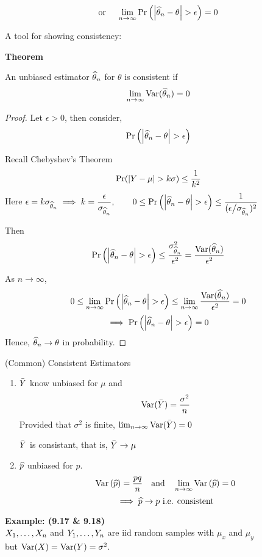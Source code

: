 $$\text{or } \quad \limn \P{\abs{\that_n - \theta} > \epsilon} = 0$$

\disc A tool for showing consistency:

\nl \textbf{Theorem}  An unbiased estimator $\widehat{\theta}_n$ for $\theta$ is consistent if
$$\limn \Var*{\that_n} = 0$$

\begin{proof}
Let $\epsilon > 0$, then consider, 
$$\prob{\left| \that_n - \theta \right| > \epsilon}$$

\nl Recall Chebyshev's Theorem
$$\Pr (\abs{Y-\mu} > k\sigma) \leq \over{k^2}$$
Here $\epsilon = k\sigma_{\that_n} \implies k = \dfrac{\epsilon}{\sigma_{\that_n}}, \qquad \displaystyle 0 \leq \P{\left| \that_n - \theta \right| > \epsilon} \leq \frac{1}{(\epsilon \big/\sigma_{\that_n})^2}$

\nl Then
$$\P{\left|\that_n- \theta \right| > \epsilon} \leq \frac{\sigma_{\that_n}^2}{\epsilon^2} = \frac{\Var*{\that_n}}{\epsilon^2}$$

\nl As $n \to \infty$,
$$0 \leq \limn \P{\left| \that_n - \theta \right| > \epsilon} \leq \limn \frac{\Var*{\that_n}}{\epsilon^2} = 0$$
$$\implies \P{\left| \that_n - \theta \right| > \epsilon} = 0$$
Hence, $\widehat{\theta}_n \to \theta$ in probability.
\end{proof}

\example (Common) Consistent Estimators

\begin{enumerate}[label=\textcircled{\raisebox{-1pt}{\arabic*}}]
	\item
		$\bar{Y}$ know unbiased for $\mu$ and
		$$\Var*{\Ybar} = \frac{\sigma^2}{n}$$
		Provided that $\sigma^2$ is finite, $\limn \Var*{\Ybar} = 0$

		\nl $\bar{Y}$ is consistant, that is, $\bar{Y} \to \mu$

	\item
		$\widehat{p}$ unbiased for $p$.
		$$\Var{\phat} = \frac{pq}{n} \quad \text{and}\quad \limn \Var{\phat} = 0$$
		$$\implies \widehat{p} \to p \text{ i.e. consistent}$$
\end{enumerate}

\nnl \textbf{Example: (9.17 \& 9.18)}\\${X}_1, \dots, {X}_n$ and ${Y}_1, \dots, {Y}_n$ are iid random samples with $\mu_x$ and $\mu_y$ \\but
$\Var*{X} = \Var*{Y} = \sigma^2$.

